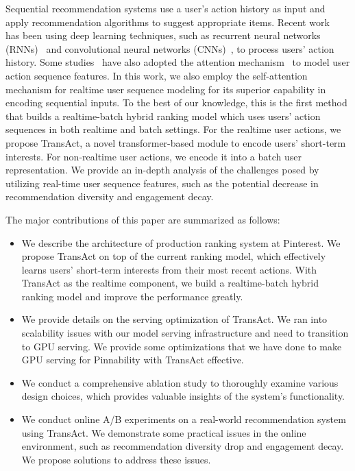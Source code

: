 Sequential recommendation systems use a user's action history as input and apply recommendation algorithms to suggest appropriate items. Recent work~\cite{donkers2017sequential, hidasi2015session, tan2016improved, zhou2019deep, tang2018personalized, tuan20173d} has been using deep learning techniques, such as recurrent neural networks (RNNs)~\cite{rnn} and convolutional neural networks (CNNs)~\cite{cnn}, to process users' action history. Some studies~\cite{DIN, zhang2019next, alibaba_seq_tfmr, li2020time, SASRec, sun2019bert4rec} have also adopted the attention mechanism~\cite{tfmr} to model user action sequence features. 
In this work, we also employ the self-attention mechanism for realtime user sequence modeling for its superior capability in encoding sequential inputs. 
To the best of our knowledge, this is the first method that builds a realtime-batch hybrid ranking model which uses users' action sequences in both realtime and batch settings. 
For the realtime user actions, we propose TransAct, a novel transformer-based module to encode users' short-term interests.
For non-realtime user actions, we encode it into a batch user representation\cite{pinnerformer}. 
We provide an in-depth analysis of the challenges posed by utilizing real-time user sequence features, such as the potential decrease in recommendation diversity and engagement decay.



The major contributions of this paper are summarized as follows:
\begin{itemize}
\item We describe the architecture of production ranking system at Pinterest. We propose TransAct on top of the current ranking model, which effectively learns users' short-term interests from their most recent actions. With TransAct as the realtime component, we build a realtime-batch hybrid ranking model and improve the performance greatly.
\item We provide details on the serving optimization of TransAct. We ran into scalability issues with our model serving infrastructure and need to transition to GPU serving. We provide some optimizations that we have done to make GPU serving for Pinnability with TransAct effective.
\item We conduct a comprehensive ablation study to thoroughly examine various design choices, which provides valuable insights of the system's functionality.
\item We conduct online A/B experiments on a real-world recommendation system using TransAct. We demonstrate some practical issues in the online environment, such as recommendation diversity drop and engagement decay. We propose solutions to address these issues.  

\end{itemize}

